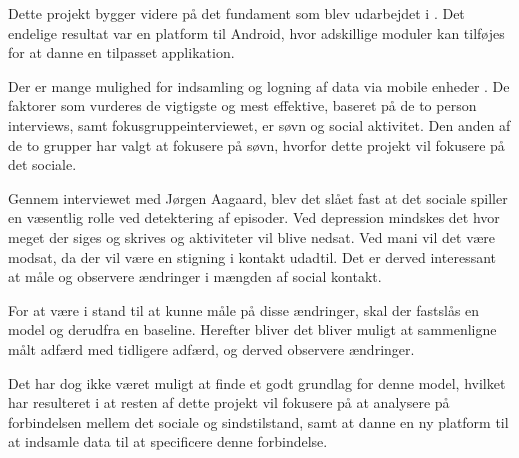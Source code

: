 Dette projekt bygger videre på det fundament som blev udarbejdet i \cite{faelles}.
Det endelige resultat var en platform til Android, hvor adskillige moduler kan tilføjes for at danne en tilpasset applikation.

Der er mange mulighed  for indsamling og logning af data via mobile enheder \cite[Indsamling af data]{faelles}.
De faktorer som vurderes de vigtigste og mest effektive, baseret på de to person interviews, samt fokusgruppeinterviewet, er søvn og social aktivitet.
Den anden af de to grupper har valgt at fokusere på søvn, hvorfor dette projekt vil fokusere på det sociale.

Gennem interviewet med Jørgen Aagaard, blev det slået fast at det sociale spiller en væsentlig rolle ved detektering af episoder.
Ved depression mindskes det hvor meget der siges og skrives og aktiviteter vil blive nedsat.
Ved mani vil det være modsat, da der vil være en stigning i kontakt udadtil.
Det er derved interessant at måle og observere ændringer i mængden af social kontakt.

For at være i stand til at kunne måle på disse ændringer, skal der fastslås en model og derudfra en baseline.
Herefter bliver det bliver muligt at sammenligne målt adfærd med tidligere adfærd, og derved observere ændringer.

Det har dog ikke været muligt at finde et godt grundlag for denne model, hvilket har resulteret i at resten af dette projekt vil fokusere på at analysere på forbindelsen mellem det sociale og sindstilstand, samt at danne en ny platform til at indsamle data til at specificere denne forbindelse.